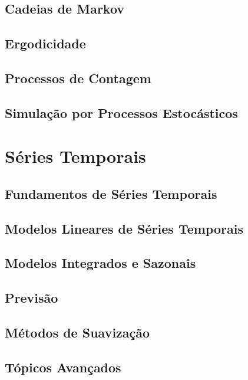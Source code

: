\documentclass[11pt, openany]{book}
\begin{document}
\chapter{Cadeias de Markov}
\chapter{Ergodicidade}
\chapter{Processos de Contagem}
\chapter{Simulação por Processos Estocásticos}

\part{Séries Temporais}

\chapter{Fundamentos de Séries Temporais}
\chapter{Modelos Lineares de Séries Temporais}
\chapter{Modelos Integrados e Sazonais}
\chapter{Previsão}
\chapter{Métodos de Suavização}
\chapter{Tópicos Avançados}
\end{document}
